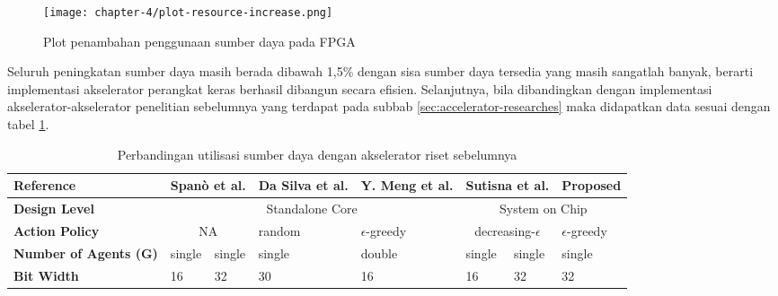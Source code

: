 \begin{figure}[h]
	\centering
	\texttt{[image: chapter-4/plot-resource-increase.png]}
	\caption{Plot penambahan penggunaan sumber daya pada \ac{FPGA}}
	\label{fig:plot-resource-increase}
\end{figure}

Seluruh peningkatan sumber daya masih berada dibawah 1,5\% dengan sisa sumber daya tersedia yang masih sangatlah banyak, berarti implementasi akselerator perangkat keras berhasil dibangun secara efisien. Selanjutnya, bila dibandingkan dengan implementasi akselerator-akselerator penelitian sebelumnya yang terdapat pada subbab \ref{sec:accelerator-researches} maka didapatkan data sesuai dengan tabel \ref{tab:comparison-utilization}.


\begin{table}[h]
	\centering
	\caption{Perbandingan utilisasi sumber daya dengan akselerator riset sebelumnya}
	\label{tab:comparison-utilization}
	\renewcommand{\arraystretch}{1.2}
	\setlength{\tabcolsep}{3pt}
	\begin{tabularx}{\textwidth}{|p{20mm}|X|X|X|X|X|X|X|}
		\hline
		\textbf{Reference}            & \multicolumn{2}{c|}{Spanò et al. \parencite{spano2019efficient}} & Da Silva et al. \parencite{dasilva2019parallel} & Y. Meng et al. \parencite{meng2020generic} & \multicolumn{2}{c|}{Sutisna et al. \parencite{sutisna2023faraneq}} & Proposed                            \\ \hline
		\textbf{Design Level}         & \multicolumn{4}{c|}{Standalone Core}                             & \multicolumn{3}{c|}{System on Chip}                                                                                                                                                                     \\ \hline
		\textbf{Action Policy}        & \multicolumn{2}{c|}{NA}                                          & random                                          & $\epsilon$-greedy                          & \multicolumn{2}{c|}{decreasing-$\epsilon$}                         & $\epsilon$-greedy                   \\ \hline
		\textbf{Number of Agents (G)} & single                                                           & single                                          & single                                     & double                                                             & single            & single & single \\ \hline
		\textbf{Bit Width}            & 16                                                               & 32                                              & 30                                         & 16                                                                 & 16                & 32     & 32     \\ \hline

\end{tabularx}
\end{table}
